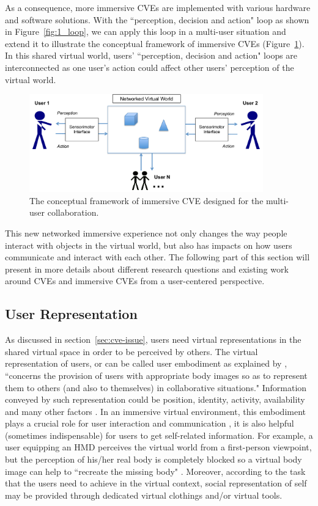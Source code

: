 As a consequence, more immersive CVEs are implemented with various hardware and software solutions. With the ``perception, decision and action" loop as shown in Figure~\ref{fig:1_loop}, we can apply this loop in a multi-user situation and extend it to illustrate the conceptual framework of immersive CVEs (Figure~\ref{fig:1_multi_loop}). In this shared virtual world, users' ``perception, decision and action" loops are interconnected as one user's action could affect other users' perception of the virtual world.

\begin{figure}[htb]
  \centering
  \includegraphics[width=0.9\textwidth]{figures/ch1/multi_loop}
  \caption{\label{fig:1_multi_loop}The conceptual framework of immersive CVE designed for the multi-user collaboration.}
\end{figure}

This new networked immersive experience not only changes the way people interact with objects in the virtual world, but also has impacts on how users communicate and interact with each other. The following part of this section will present in more details about different research questions and existing work around CVEs and immersive CVEs from a user-centered perspective.

\subsection{User Representation}
As discussed in section~\ref{sec:cve-issue}, users need virtual representations in the shared virtual space in order to be perceived by others. The virtual representation of users, or can be called user embodiment as explained by \citep{Benford1995Embodiment}, ``concerns the provision of users with appropriate body images so as to represent them to others (and also to themselves) in collaborative situations." Information conveyed by such representation could be position, identity, activity, availability and many other factors \citep{Thalmann2001VHR}. In an immersive virtual environment, this embodiment plays a crucial role for user interaction and communication \citep{Slater1994Body}, it is also helpful (sometimes indispensable) for users to get self-related information. For example, a user equipping an HMD perceives the virtual world from a first-person viewpoint, but the perception of his/her real body is completely blocked so a virtual body image can help to ``recreate the missing body" \citep{Lok2003Effects, Mohler2010Effect}. Moreover, according to the task that the users need to achieve in the virtual context, social representation of self may be provided through dedicated virtual clothings and/or virtual tools. 

